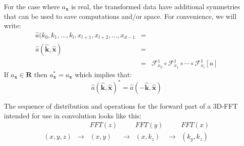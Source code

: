 \documentclass[pdftex,finalversion,simpleeqnnos,titlepage,12pt]{article}
\newcommand{\R}{\ensuremath{\mathbf{R}}}
\begin{document}
For the case where $a_{\mathbf{x}}$ is real, the transformed data have
additional symmetries that can be used to save computations and/or
space.  For convenience, we will write:
\begin{eqnarray}
\hat{a}(k_0, k_1,\ldots,k_l,x_{l+1},x_{l+2},\ldots,x_{d-1} &=&\nonumber \\
\hat{a}(\mathbf{\hat{k}},\mathbf{\hat{x}}) &=&\nonumber \\
&=& \mathcal{F}_{x_0}^{1}\circ\mathcal{F}_{x_1}^{1}\circ\cdots\circ\mathcal{F}_{x_l}^{1}[a] \nonumber
\end{eqnarray}
If $a_{\mathbf{x}} \in \R$ then $a_{\mathbf{x}}^{*} = a_{\mathbf{x}}$
which implies that:
\begin{displaymath}
\hat{a}(\mathbf{\hat{k}},\mathbf{\hat{x}})^{*} =
\hat{a}(-\mathbf{\hat{k}},\mathbf{\hat{x}}) \nonumber
\end{displaymath}


The sequence of distribution and operations for the forward part of a
3D-FFT intended for use in convolution looks like this:
\begin{equation}
\begin{array}{ccccccc}
  & & FFT(z) & & FFT(y) & & FFT(x) \\
  (x, y, z)& \longrightarrow & (x, y) & \longrightarrow & (x, k_z) &
  \longrightarrow & (k_y, k_z)
\end{array}
\end{equation}

\end{document}
